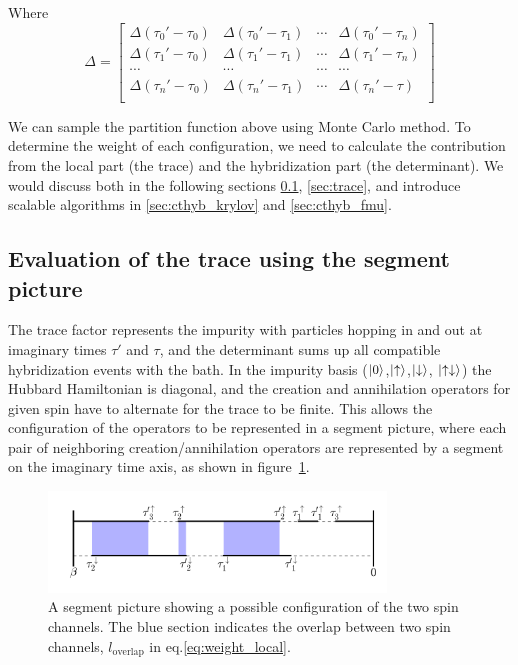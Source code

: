 Where 
\begin{equation}
  \label{eq:hyb-matrix}
  \Delta=\left[
    \begin{array}{cccc}
      \Delta(\tau_0'-\tau_0) & \Delta(\tau_0'-\tau_1) & \cdots & \Delta(\tau_0'-\tau_n)\\
      \Delta(\tau_1'-\tau_0) & \Delta(\tau_1'-\tau_1) & \cdots & \Delta(\tau_1'-\tau_n)\\
      \cdots & \cdots & \cdots & \cdots \\
      \Delta(\tau_n'-\tau_0) & \Delta(\tau_n'-\tau_1) & \cdots & \Delta(\tau_n'-\tau)\\
    \end{array}
  \right]
\end{equation}


We can sample the partition function above using Monte Carlo method. To 
determine the weight of each configuration, we need to calculate the contribution
from the local part (the trace) and the hybridization part (the determinant).
We would discuss both in the following sections \ref{sec:trace_segment},
\ref{sec:trace}, and introduce scalable 
algorithms in \ref{sec:cthyb_krylov} and \ref{sec:cthyb_fmu}.

\subsection{Evaluation of the trace using the segment picture}
\label{sec:trace_segment}
The trace factor represents the impurity with particles hopping in and out at 
imaginary times $\tau'$ and $\tau$, and the determinant sums up all compatible 
hybridization events with the bath. 
In the impurity basis ($\left|0\right\rangle$,$\left|\uparrow\right\rangle$,$\left|\downarrow\right\rangle$,
$\left|\uparrow\downarrow\right\rangle$) the Hubbard Hamiltonian is diagonal, 
and the creation and annihilation operators for given spin have to alternate 
for the trace to be finite. This allows the configuration of the operators to be
represented in a segment picture, where each pair of neighboring creation/annihilation 
operators are represented by a segment on the imaginary time axis, as shown in 
figure~\ref{fig:seg}.

\begin{figure}[ht]
  \centering
  \includegraphics[width=0.8\textwidth] {img/segment.png}
  \caption{A segment picture showing a possible configuration of the two spin 
    channels. 
    The blue section indicates the overlap between two spin channels, 
    $l_\textrm{overlap}$ in eq.\ref{eq:weight_local}.}
\label{fig:seg}
\end{figure}



